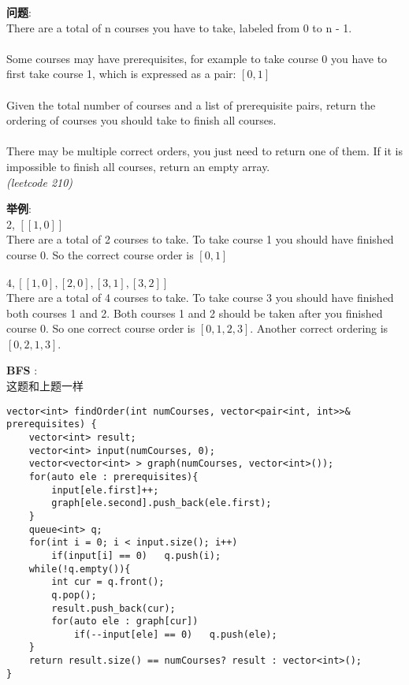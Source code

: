     
\begin{description}
    \item{\textbf{问题}}:\\
There are a total of n courses you have to take, labeled from 0 to n - 1.\\
\\
Some courses may have prerequisites, for example to take course 0 you have to first take course 1, which is expressed as a pair: $[0,1]$ \\
\\
Given the total number of courses and a list of prerequisite pairs, return the ordering of courses you should take to finish all courses.\\
\\
There may be multiple correct orders, you just need to return one of them. If it is impossible to finish all courses, return an empty array.\\
\textit{(leetcode 210)}
    \item{\textbf{举例}}:\\
2, $[[1,0]]$ \\
There are a total of 2 courses to take. To take course 1 you should have finished course 0. So the correct course order is $[0,1]$ \\
\\
$4, [[1,0],[2,0],[3,1],[3,2]]$ \\
There are a total of 4 courses to take. To take course 3 you should have finished both courses 1 and 2. Both courses 1 and 2 should be taken after you finished course 0. So one correct course order is $[0,1,2,3]$. Another correct ordering is$[0,2,1,3]$.\\
    \item{\textbf{BFS}} : 
    \\这题和上题一样
    \begin{lstlisting}
vector<int> findOrder(int numCourses, vector<pair<int, int>>& prerequisites) {
	vector<int> result;
	vector<int> input(numCourses, 0);
	vector<vector<int> > graph(numCourses, vector<int>());
	for(auto ele : prerequisites){
		input[ele.first]++;
		graph[ele.second].push_back(ele.first);
	}
	queue<int> q;
	for(int i = 0; i < input.size(); i++)
		if(input[i] == 0)	q.push(i);
	while(!q.empty()){
		int cur = q.front();
		q.pop();
		result.push_back(cur);
		for(auto ele : graph[cur])
			if(--input[ele] == 0)	q.push(ele);
	}
	return result.size() == numCourses? result : vector<int>();
}
    \end{lstlisting}
\end{description}
